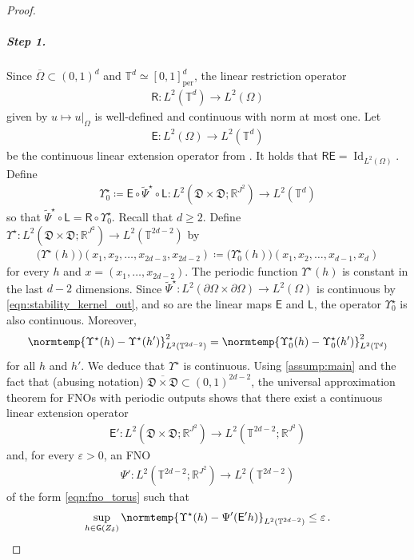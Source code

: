 \documentclass[pdflatex,sn-mathphys-num]{sn-jnl-preprint}
\newcommand{\R}{\mathbb{R}}
\newcommand{\T}{\mathbb{T}}
\newcommand{\sfE}{\mathsf{E}}
\newcommand{\sfG}{\mathsf{G}}
\newcommand{\sfL}{\mathsf{L}}
\newcommand{\sfR}{\mathsf{R}}
\newcommand{\pOmega}{{\partial\Omega}}
\newcommand{\norm}{\normtemp}
\newcommand{\defeq}{\coloneqq} %
\DeclareMathOperator{\Id}{Id} %
\newcommand{\ep}{\varepsilon}
\theoremstyle{thmstyleone}%
\theoremstyle{thmstyletwo}%
\theoremstyle{thmstylethree}%
\numberwithin{equation}{section}
\numberwithin{theorem}{section}
\begin{document}
\begin{proof}
    \subparagraph*{\emph{\textbf{Step 1.}}}
    Since $\overline{\Omega}\subset(0,1)^d$ and $\T^d\simeq[0,1]^d_{\mathrm{per}}$, the linear restriction operator 
    \begin{align*}
    \sfR \colon L^2(\T^d)\to L^2(\Omega)
    \end{align*}
    given by $u\mapsto u|_{\Omega}$ is well-defined and continuous with norm at most one. Let 
    \begin{align*}
        \sfE\colon L^2(\Omega)\to L^2(\T^d)
    \end{align*}
    be the continuous linear extension operator from \cite[Lemma~B.1, p.~34, applied with $d_u=d_y=1$ and $s=s'=0$]{huang2025operator}. It holds that $\sfR\sfE=\Id_{L^2(\Omega)}$.
    Define 
    \begin{align*}
        \Upsilon_0^\star\defeq \sfE\circ\widetilde{\Psi}^\star\circ \sfL\colon L^2(\mathfrak{D}\times\mathfrak{D};\R^{J^2})\to L^2(\T^d)
    \end{align*}
    so that $\widetilde{\Psi}^\star\circ \sfL= \sfR\circ \Upsilon_0^\star$. 
    Recall that $d\geq 2$.
    Define $\Upsilon^\star\colon L^2(\mathfrak{D}\times\mathfrak{D};\R^{J^2})\to L^2(\T^{2d-2})$ by
    \begin{align*}%
        \bigl(\Upsilon^\star (h)\bigr)(x_1,x_2,\ldots, x_{2d-3}, x_{2d-2})\defeq \bigl(\Upsilon^\star_0 (h)\bigr)(x_1,x_2,\ldots, x_{d-1},x_d)
    \end{align*}
    for every $h$ and $x=(x_1,\ldots,x_{2d-2})$. The periodic function  $\Upsilon^\star (h)$ is constant in the last $d-2$ dimensions.
    Since $\widetilde{\Psi}^\star\colon L^2(\pOmega\times\pOmega)\to L^2(\Omega)$ is continuous by \eqref{eqn:stability_kernel_out}, and so are the linear maps $\sfE$ and $\sfL$, the operator $\Upsilon_0^\star$ is also continuous. Moreover,
    \begin{align*}
        \norm{\Upsilon^\star(h)-\Upsilon^\star(h')}^2_{L^2(\T^{2d-2})}=\norm{\Upsilon^\star_0(h)-\Upsilon^\star_0(h')}^2_{L^2(\T^{d})}
    \end{align*}
    for all $h$ and $h'$. We deduce that $\Upsilon^\star$ is continuous.
    Using \cref{assump:main} and the fact that (abusing notation) $\overline{\mathfrak{D}\times\mathfrak{D}}\subset (0,1)^{2d-2}$, the universal approximation theorem for FNOs with periodic outputs \cite[Lemma~B.1, p.~34, applied with $s=s'=0$, $d_u=J^2$, and $d_y=1$]{huang2025operator} shows that there exist a continuous linear extension operator 
    \begin{align*}
    \sfE'\colon L^2(\mathfrak{D}\times\mathfrak{D};\R^{J^2})\to L^2(\T^{2d-2};\R^{J^2})    
    \end{align*}
    and, for every $\ep>0$, an FNO
    \begin{align*}
    \Psi'\colon L^2(\T^{2d-2};\R^{J^2})\to L^2(\T^{2d-2})    
    \end{align*}
    of the form \eqref{eqn:fno_torus} such that
    \begin{align*}
        \sup_{h\in\sfG(Z_\delta)}\norm{\Upsilon^\star(h)-\Psi'(\sfE' h)}_{L^2(\T^{2d-2})}\leq \ep\,.
    \end{align*}


\end{proof}
\end{document}
